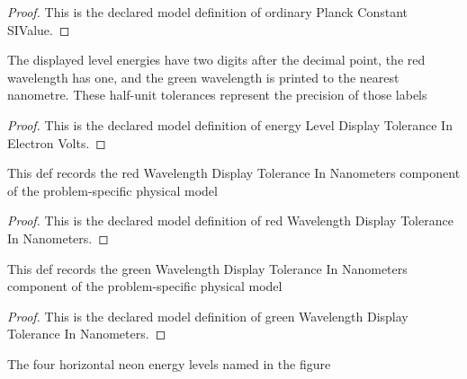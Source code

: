\begin{proof}
  This is the declared model definition of ordinary Planck Constant SIValue.
\end{proof}
\begin{definition}
  \label{def:physics:phyx-mini-0537:phyxminiproblems-problemphyxmini0537-energyleveldisplaytoleranceinelectronvolts}
  The displayed level energies have two digits after the decimal point, the red wavelength has one, and the green wavelength is printed to the nearest nanometre. These half-unit tolerances represent the precision of those labels
\end{definition}
\begin{proof}
  This is the declared model definition of energy Level Display Tolerance In Electron Volts.
\end{proof}
\begin{definition}
  \label{def:physics:phyx-mini-0537:phyxminiproblems-problemphyxmini0537-redwavelengthdisplaytoleranceinnanometers}
  This def records the red Wavelength Display Tolerance In Nanometers component of the problem-specific physical model
\end{definition}
\begin{proof}
  This is the declared model definition of red Wavelength Display Tolerance In Nanometers.
\end{proof}
\begin{definition}
  \label{def:physics:phyx-mini-0537:phyxminiproblems-problemphyxmini0537-greenwavelengthdisplaytoleranceinnanometers}
  This def records the green Wavelength Display Tolerance In Nanometers component of the problem-specific physical model
\end{definition}
\begin{proof}
  This is the declared model definition of green Wavelength Display Tolerance In Nanometers.
\end{proof}
\begin{definition}
  \label{def:physics:phyx-mini-0537:phyxminiproblems-problemphyxmini0537-atomicenergylevel}
  The four horizontal neon energy levels named in the figure
\end{definition}
